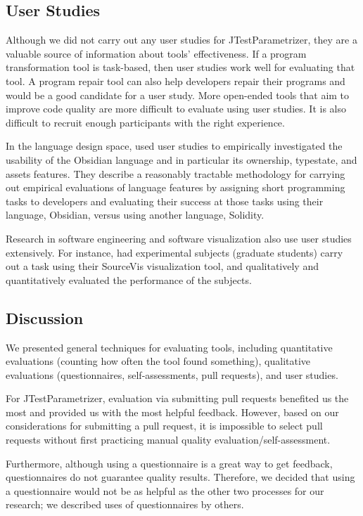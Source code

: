 \subsection{User Studies}
Although we did not carry out any user studies for JTestParametrizer, they
are a valuable source of information about tools' effectiveness. 
If a program transformation tool is task-based, then user studies work
well for evaluating that tool. A program repair tool can also help developers
repair their programs and would be a good candidate for a user study.
More open-ended tools that aim to improve code quality are more difficult
to evaluate using user studies. It is also
difficult to recruit enough participants with the right experience.

In the language design space,  used user studies to empirically
investigated the usability of the Obsidian language and in particular
its ownership, typestate, and assets features. They describe a
reasonably tractable methodology for carrying out empirical
evaluations of language features by assigning short programming tasks
to developers and evaluating their success at those tasks using their
language, Obsidian, versus using another language, Solidity.

Research in software engineering and software visualization also use
user studies extensively.  For instance,  had
experimental subjects (graduate students) carry out a task using their
SourceVis visualization tool, and qualitatively and quantitatively
evaluated the performance of the subjects.


\subsection{Discussion}
We presented general techniques for evaluating tools, including
quantitative evaluations (counting how often the tool found something),
qualitative evaluations (questionnaires, self-assessments, pull requests),
and user studies.

For JTestParametrizer, evaluation via submitting pull requests benefited us the most and provided us with the most helpful feedback. However, based on our considerations for submitting a pull request, it is impossible to select pull requests without first practicing manual quality evaluation/self-assessment.

Furthermore, although using a questionnaire is a great way to get feedback, questionnaires do not guarantee quality results. Therefore, we decided that using a questionnaire would not be as helpful as the other two processes for our research; we described uses of questionnaires by others.

